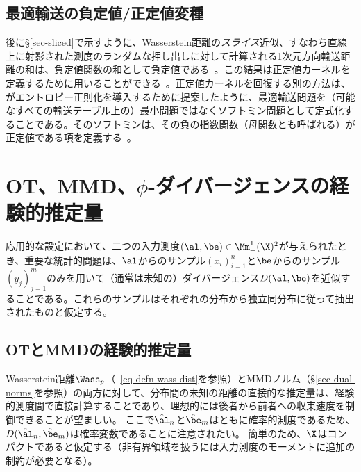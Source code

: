 \subsection{最適輸送の負定値/正定値変種}

後に\S\ref{sec-sliced}で示すように、Wasserstein距離の\emph{スライス}近似、すなわち直線上に射影された測度のランダムな押し出しに対して計算される1次元方向輸送距離の和は、負定値関数の和として負定値である~\citep[\S 3.1.11]{berg84harmonic}。この結果は正定値カーネルを定義するために用いることができる~\citep{kolouri2016sliced}。正定値カーネルを回復する別の方法は、\citet{kosowsky1994invisible}がエントロピー正則化を導入するために提案したように、最適輸送問題を（可能なすべての輸送テーブル上の）最小問題ではなくソフトミン問題として定式化することである。そのソフトミンは、その負の指数関数（母関数とも呼ばれる）が正定値である項を定義する~\citep{cuturi2012positivity}。





\section{OT、MMD、$\phi$-ダイバージェンスの経験的推定量}
\label{sec-empirical-wass}

応用的な設定において、二つの入力測度$(\al,\be) \in \Mm_+^1(\X)^2$が与えられたとき、重要な統計的問題は、$\al$からのサンプル$(x_i)_{i=1}^n$と$\be$からのサンプル$(y_j)_{j=1}^m$のみを用いて（通常は未知の）ダイバージェンス$D(\al,\be)$を近似することである。これらのサンプルはそれぞれの分布から独立同分布に従って抽出されたものと仮定する。

\subsection{OTとMMDの経験的推定量}

Wasserstein距離$\Wass_p$（~\ref{eq-defn-wass-dist}を参照）とMMDノルム（\S\ref{sec-dual-norms}を参照）の両方に対して、分布間の未知の距離の直接的な推定量は、経験的測度間で直接計算することであり、理想的には後者から前者への収束速度を制御できることが望ましい。
ここで$\hat \al_n$と$\hat \be_m$はともに確率的測度であるため、$D(\hat \al_n,\hat \be_m)$は確率変数であることに注意されたい。
%
簡単のため、$\X$はコンパクトであると仮定する（非有界領域を扱うには入力測度のモーメントに追加の制約が必要となる）。

